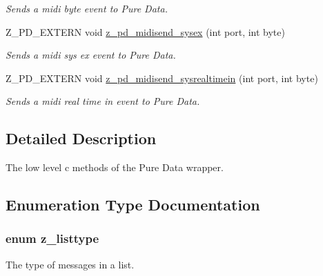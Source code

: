 \begin{DoxyCompactItemize}
\begin{DoxyCompactList}\small\item\em Sends a midi byte event to Pure Data. \end{DoxyCompactList}\item 
\hypertarget{group__zpd_ga3085f7094d52046158c5b8dc017d468b}{Z\-\_\-\-P\-D\-\_\-\-E\-X\-T\-E\-R\-N void \hyperlink{group__zpd_ga3085f7094d52046158c5b8dc017d468b}{z\-\_\-pd\-\_\-midisend\-\_\-sysex} (int port, int byte)}\label{group__zpd_ga3085f7094d52046158c5b8dc017d468b}

\begin{DoxyCompactList}\small\item\em Sends a midi sys ex event to Pure Data. \end{DoxyCompactList}\item 
\hypertarget{group__zpd_ga000f176a19a596f1f2302fec8a3fb827}{Z\-\_\-\-P\-D\-\_\-\-E\-X\-T\-E\-R\-N void \hyperlink{group__zpd_ga000f176a19a596f1f2302fec8a3fb827}{z\-\_\-pd\-\_\-midisend\-\_\-sysrealtimein} (int port, int byte)}\label{group__zpd_ga000f176a19a596f1f2302fec8a3fb827}

\begin{DoxyCompactList}\small\item\em Sends a midi real time in event to Pure Data. \end{DoxyCompactList}\end{DoxyCompactItemize}


\subsection{Detailed Description}
The low level c methods of the Pure Data wrapper. 

\subsection{Enumeration Type Documentation}
\hypertarget{group__zpd_ga88e6eaf6d7bd0aed886cfc104e2c8c7c}{
\subsubsection[{z\-\_\-listtype}]{\setlength{\rightskip}{0pt plus 5cm}enum {\bf z\-\_\-listtype}}}\label{group__zpd_ga88e6eaf6d7bd0aed886cfc104e2c8c7c}


The type of messages in a list. 

